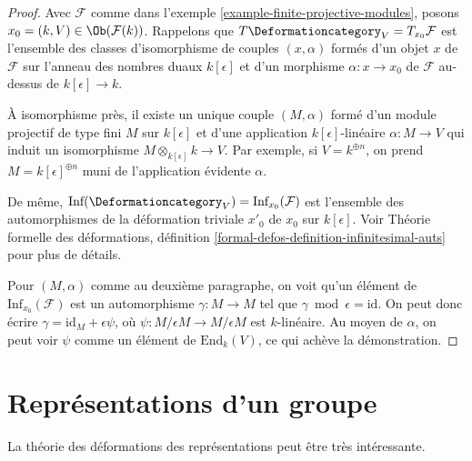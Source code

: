 \begin{proof}
Avec $\mathcal{F}$ comme dans l'exemple \ref{example-finite-projective-modules},
posons $x_0 = (k, V) \in \Ob(\mathcal{F}(k))$.
Rappelons que $T\Deformationcategory_V = T_{x_0}\mathcal{F}$
est l'ensemble des classes d'isomorphisme
de couples $(x, \alpha)$ formés d'un objet $x$ de $\mathcal{F}$
sur l'anneau des nombres duaux $k[\epsilon]$ et d'un morphisme
$\alpha : x \to x_0$ de $\mathcal{F}$ au-dessus de $k[\epsilon] \to k$.

\medskip\noindent
À isomorphisme près, il existe un unique couple $(M, \alpha)$ formé d'un
module projectif de type fini $M$ sur $k[\epsilon]$
et d'une application $k[\epsilon]$-linéaire $\alpha : M \to V$
qui induit un isomorphisme $M \otimes_{k[\epsilon]} k \to V$.
Par exemple, si $V = k^{\oplus n}$, on prend
$M = k[\epsilon]^{\oplus n}$ muni de l'application évidente $\alpha$.

\medskip\noindent
De même, $\text{Inf}(\Deformationcategory_V) = \text{Inf}_{x_0}(\mathcal{F})$
est l'ensemble des automorphismes
de la déformation triviale $x'_0$ de $x_0$ sur $k[\epsilon]$.
Voir Théorie formelle des déformations, définition
\ref{formal-defos-definition-infinitesimal-auts} pour plus de détails.

\medskip\noindent
Pour $(M, \alpha)$ comme au deuxième paragraphe, on voit qu'un élément de
$\text{Inf}_{x_0}(\mathcal{F})$ est un automorphisme $\gamma : M \to M$ tel que
$\gamma \bmod \epsilon = \text{id}$. On peut donc écrire
$\gamma = \text{id}_M + \epsilon \psi$, où
$\psi : M/\epsilon M \to M/\epsilon M$ est $k$-linéaire.
Au moyen de $\alpha$, on peut voir $\psi$ comme un élément de
$\text{End}_k(V)$, ce qui achève la démonstration.
\end{proof}



\section{Représentations d'un groupe}
\label{section-representations}

\noindent
La théorie des déformations des représentations peut être très intéressante.

